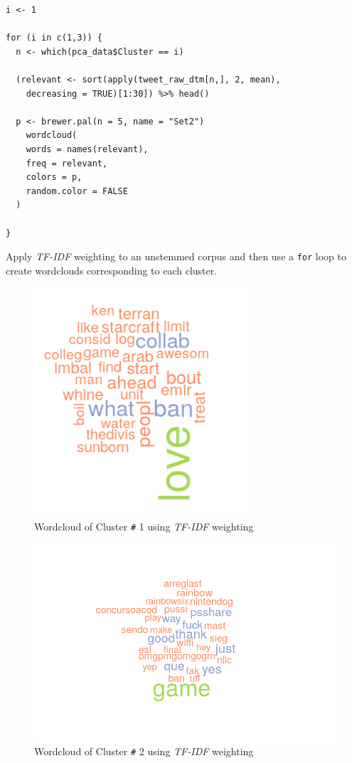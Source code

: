 \documentclass[11pt]{article}
\begin{document}
\begin{listing}[htbp]
\begin{verbatim}
i <- 1

for (i in c(1,3)) {
  n <- which(pca_data$Cluster == i)

  (relevant <- sort(apply(tweet_raw_dtm[n,], 2, mean),
    decreasing = TRUE)[1:30]) %>% head()

  p <- brewer.pal(n = 5, name = "Set2")
    wordcloud(
    words = names(relevant),
    freq = relevant,
    colors = p,
    random.color = FALSE
  )

}
\end{verbatim}
\caption{\label{org946dec1}Apply \emph{TF-IDF} weighting to an unstemmed corpus and then use a \texttt{for} loop to create wordclouds corresponding to each cluster.}
\end{listing}

\begin{figure}[htbp]
\centering
\includegraphics[width=8cm]{./Figures/Cluster1Cloud.png}
\caption{\label{fig:org232ec1f}Wordcloud of Cluster \texttt{\#} 1 using \emph{TF-IDF} weighting}
\end{figure}

\begin{figure}[htbp]
\centering
\includegraphics[width=14cm]{./Figures/Cluster2Cloud.png}
\caption{\label{fig:org1447f1e}Wordcloud of Cluster \texttt{\#} 2 using \emph{TF-IDF} weighting}
\end{figure}
\end{document}
